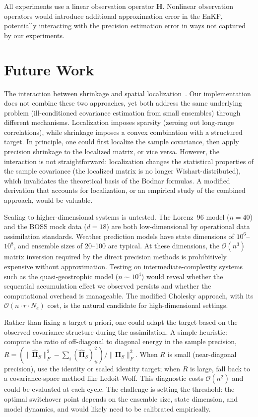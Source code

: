 All experiments use a linear observation operator $\mathbf{H}$. Nonlinear observation operators would introduce additional approximation error in the EnKF, potentially interacting with the precision estimation error in ways not captured by our experiments.

\section{Future Work}

The interaction between shrinkage and spatial localization~\citep{gaspari1999construction, nino2018ensemble}. Our implementation does not combine these two approaches, yet both address the same underlying problem (ill-conditioned covariance estimation from small ensembles) through different mechanisms. Localization imposes sparsity (zeroing out long-range correlations), while shrinkage imposes a convex combination with a structured target. In principle, one could first localize the sample covariance, then apply precision shrinkage to the localized matrix, or vice versa. However, the interaction is not straightforward: localization changes the statistical properties of the sample covariance (the localized matrix is no longer Wishart-distributed), which invalidates the theoretical basis of the Bodnar formulas. A modified derivation that accounts for localization, or an empirical study of the combined approach, would be valuable.

Scaling to higher-dimensional systems is untested. The Lorenz~96 model ($n = 40$) and the BOSS mock data ($d = 18$) are both low-dimensional by operational data assimilation standards. Weather prediction models have state dimensions of $10^6$--$10^8$, and ensemble sizes of 20--100 are typical. At these dimensions, the $\mathcal{O}(n^3)$ matrix inversion required by the direct precision methods is prohibitively expensive without approximation. Testing on intermediate-complexity systems such as the quasi-geostrophic model ($n \sim 10^4$) would reveal whether the sequential accumulation effect we observed persists and whether the computational overhead is manageable. The modified Cholesky approach, with its $\mathcal{O}(n \cdot r \cdot N_e)$ cost, is the natural candidate for high-dimensional settings.

Rather than fixing a target a priori, one could adapt the target based on the observed covariance structure during the assimilation. A simple heuristic: compute the ratio of off-diagonal to diagonal energy in the sample precision, $R = (\|\hat{\boldsymbol{\Pi}}_S\|_F^2 - \sum_i (\hat{\boldsymbol{\Pi}}_S)_{ii}^2) / \|\hat{\boldsymbol{\Pi}}_S\|_F^2$. When $R$ is small (near-diagonal precision), use the identity or scaled identity target; when $R$ is large, fall back to a covariance-space method like Ledoit-Wolf. This diagnostic costs $\mathcal{O}(n^2)$ and could be evaluated at each cycle. The challenge is setting the threshold: the optimal switchover point depends on the ensemble size, state dimension, and model dynamics, and would likely need to be calibrated empirically.

